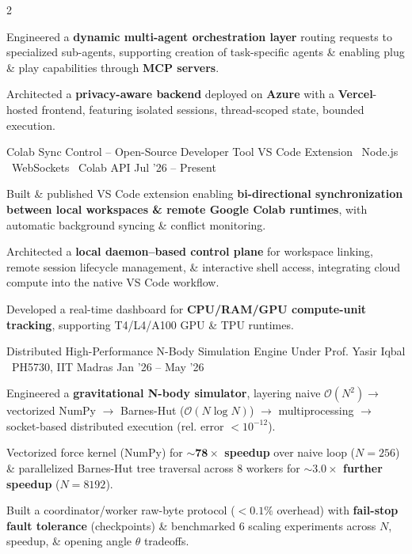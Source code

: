\documentclass{resume}
\begin{document}
\begin{paracol}{2}
{\begin{resumeItemize}
\item Engineered a \textbf{dynamic multi-agent orchestration layer} routing requests to specialized sub-agents, supporting creation of task-specific agents \& enabling plug \& play capabilities through \textbf{MCP servers}.

\item Architected a \textbf{privacy-aware backend} deployed on \textbf{Azure} with a \textbf{Vercel}-hosted frontend, featuring isolated sessions, thread-scoped state, bounded execution.
\end{resumeItemize}
}
{\href{https://github.com/hemanthdatta/digital-hemanth}{\faGithub}}
\resumeDivider

\resumeProject
{Colab Sync Control -- Open-Source Developer Tool \href{https://marketplace.visualstudio.com/items?itemName=crimson-blitz.colab-sync-vscode}{\small\faGlobe}}
{VS Code Extension \textbar\ Node.js \textbar\ WebSockets \textbar\ Colab API}
{Jul '26 -- Present}
{
\begin{resumeItemize}
\item Built \& published VS Code extension enabling \textbf{bi-directional synchronization between local workspaces \& remote Google Colab runtimes}, with automatic background syncing \& conflict monitoring.
\item Architected a \textbf{local daemon--based control plane} for workspace linking, remote session lifecycle management, \& interactive shell access, integrating cloud compute into the native VS Code workflow.
\item Developed a real-time dashboard for \textbf{CPU/RAM/GPU compute-unit tracking}, supporting T4/L4/A100 GPU \& TPU runtimes.
\end{resumeItemize}
}
{\href{https://github.com/NikhilSwaroop-P/colab-sync-vscode}{\faGithub}}
\resumeDivider

\resumeProject
{Distributed High-Performance N-Body Simulation Engine \href{https://hemanthdatta.github.io/comp-phy-proj/}{\small\faGlobe}}
{Under Prof. Yasir Iqbal \textbar\ PH5730, IIT Madras}
{Jan '26 -- May '26}
{
\begin{resumeItemize}
\item Engineered a \textbf{gravitational N-body simulator}, layering naive $\mathcal{O}(N^2) \rightarrow$ vectorized NumPy $\rightarrow$ Barnes-Hut ($\mathcal{O}(N \log N)$) $\rightarrow$ multiprocessing $\rightarrow$ socket-based distributed execution (rel. error $< 10^{-12}$).
\item Vectorized force kernel (NumPy) for \textbf{$\mathbf{\sim 78\times}$ speedup} over naive loop ($N=256$) \& parallelized Barnes-Hut tree traversal across 8 workers for \textbf{$\mathbf{\sim 3.0\times}$ further speedup} ($N=8192$).
\item Built a coordinator/worker raw-byte protocol ($<0.1\%$ overhead) with \textbf{fail-stop fault tolerance} (checkpoints) \& benchmarked 6 scaling experiments across $N$, speedup, \& opening angle $\theta$ tradeoffs.
\end{resumeItemize}
}
{\href{https://github.com/hemanthdatta/comp-phy-proj}{\faGithub}}
\resumeDivider


\end{paracol}
\end{document}
